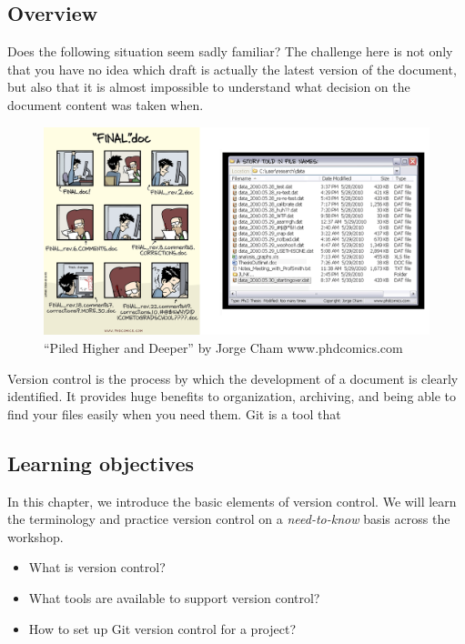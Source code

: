 \documentclass[
  letterpaper,
  DIV=11,
  numbers=noendperiod]{scrreprt}
\begin{document}
\hypertarget{overview-1}{%
\subsection{Overview}\label{overview-1}}

Does the following situation seem sadly familiar? The challenge here is
not only that you have no idea which draft is actually the latest
version of the document, but also that it is almost impossible to
understand what decision on the document content was taken when.

\begin{figure}

{\centering \includegraphics{./images/paste-2840AEE3.png}

}

\caption{\label{fig-final-doc}``Piled Higher and Deeper'' by Jorge Cham
www.phdcomics.com}

\end{figure}

Version control is the process by which the development of a document is
clearly identified. It provides huge benefits to organization,
archiving, and being able to find your files easily when you need them.
Git is a tool that

\hypertarget{learning-objectives-2}{%
\subsection{Learning objectives}\label{learning-objectives-2}}

In this chapter, we introduce the basic elements of version control. We
will learn the terminology and practice version control on a
\emph{need-to-know} basis across the workshop.

\begin{itemize}
\item
  What is version control?
\item
  What tools are available to support version control?
\item
  How to set up Git version control for a project?
\end{itemize}
\end{document}

